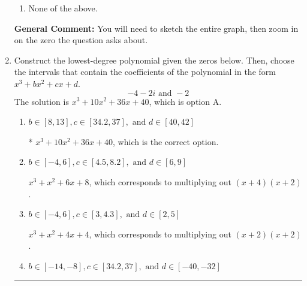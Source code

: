 \documentclass{extbook}[14pt]
\newcommand{\litem}[1]{\item #1

\rule{\textwidth}{0.4pt}}
\begin{document}
\begin{enumerate}
{\begin{enumerate}[label=\Alph*.]
\item None of the above.\end{enumerate}
\textbf{General Comment:} You will need to sketch the entire graph, then zoom in on the zero the question asks about.
}
\litem{
Construct the lowest-degree polynomial given the zeros below. Then, choose the intervals that contain the coefficients of the polynomial in the form $x^3+bx^2+cx+d$.
\[ -4 - 2 i \text{ and } -2 \]The solution is \( x^{3} +10 x^{2} +36 x + 40 \), which is option A.\begin{enumerate}[label=\Alph*.]
\item \( b \in [8, 13], c \in [34.2, 37], \text{ and } d \in [40, 42] \)

* $x^{3} +10 x^{2} +36 x + 40$, which is the correct option.
\item \( b \in [-4, 6], c \in [4.5, 8.2], \text{ and } d \in [6, 9] \)

$x^{3} + x^{2} +6 x + 8$, which corresponds to multiplying out $(x + 4)(x + 2)$.
\item \( b \in [-4, 6], c \in [3, 4.3], \text{ and } d \in [2, 5] \)

$x^{3} + x^{2} +4 x + 4$, which corresponds to multiplying out $(x + 2)(x + 2)$.
\item \( b \in [-14, -8], c \in [34.2, 37], \text{ and } d \in [-40, -32] \)


\end{enumerate}}
\end{enumerate}
\end{document}
